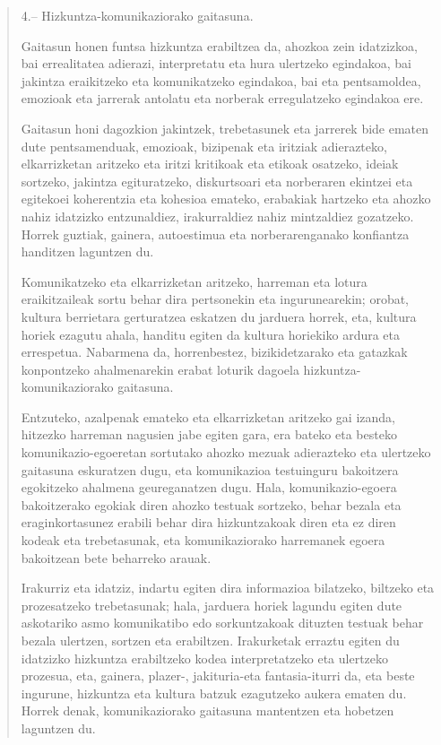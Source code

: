 \documentclass[
]{book}
\begin{document}
\begin{quote}
4.-- Hizkuntza-komunikaziorako gaitasuna.

Gaitasun honen funtsa hizkuntza erabiltzea da, ahozkoa zein idatzizkoa, bai errealitatea adierazi, interpretatu eta hura ulertzeko egindakoa, bai jakintza eraikitzeko eta komunikatzeko egindakoa, bai eta pentsamoldea, emozioak eta jarrerak antolatu eta norberak erregulatzeko egindakoa ere.

Gaitasun honi dagozkion jakintzek, trebetasunek eta jarrerek bide ematen dute pentsamenduak, emozioak, bizipenak eta iritziak adierazteko, elkarrizketan aritzeko eta iritzi kritikoak eta etikoak osatzeko, ideiak sortzeko, jakintza egituratzeko, diskurtsoari eta norberaren ekintzei eta egitekoei koherentzia eta kohesioa emateko, erabakiak hartzeko eta ahozko nahiz idatzizko entzunaldiez, irakurraldiez nahiz mintzaldiez gozatzeko. Horrek guztiak, gainera, autoestimua eta norberarenganako konfiantza handitzen laguntzen du.

Komunikatzeko eta elkarrizketan aritzeko, harreman eta lotura eraikitzaileak sortu behar dira pertsonekin eta ingurunearekin; orobat, kultura berrietara gerturatzea eskatzen du jarduera horrek, eta, kultura horiek ezagutu ahala, handitu egiten da kultura horiekiko ardura eta errespetua. Nabarmena da, horrenbestez, bizikidetzarako eta gatazkak konpontzeko ahalmenarekin erabat loturik dagoela hizkuntza-komunikaziorako gaitasuna.

Entzuteko, azalpenak emateko eta elkarrizketan aritzeko gai izanda, hitzezko harreman nagusien jabe egiten gara, era bateko eta besteko komunikazio-egoeretan sortutako ahozko mezuak adierazteko eta ulertzeko gaitasuna eskuratzen dugu, eta komunikazioa testuinguru bakoitzera egokitzeko ahalmena geureganatzen dugu. Hala, komunikazio-egoera bakoitzerako egokiak diren ahozko testuak sortzeko, behar bezala eta eraginkortasunez erabili behar dira hizkuntzakoak diren eta ez diren kodeak eta trebetasunak, eta komunikaziorako harremanek egoera bakoitzean bete beharreko arauak.

Irakurriz eta idatziz, indartu egiten dira informazioa bilatzeko, biltzeko eta prozesatzeko trebetasunak; hala, jarduera horiek lagundu egiten dute askotariko asmo komunikatibo edo sorkuntzakoak dituzten testuak behar bezala ulertzen, sortzen eta erabiltzen. Irakurketak erraztu egiten du idatzizko hizkuntza erabiltzeko kodea interpretatzeko eta ulertzeko prozesua, eta, gainera, plazer-, jakituria-eta fantasia-iturri da, eta beste ingurune, hizkuntza eta kultura batzuk ezagutzeko aukera ematen du. Horrek denak, komunikaziorako gaitasuna mantentzen eta hobetzen laguntzen du.


\end{quote}
\end{document}
